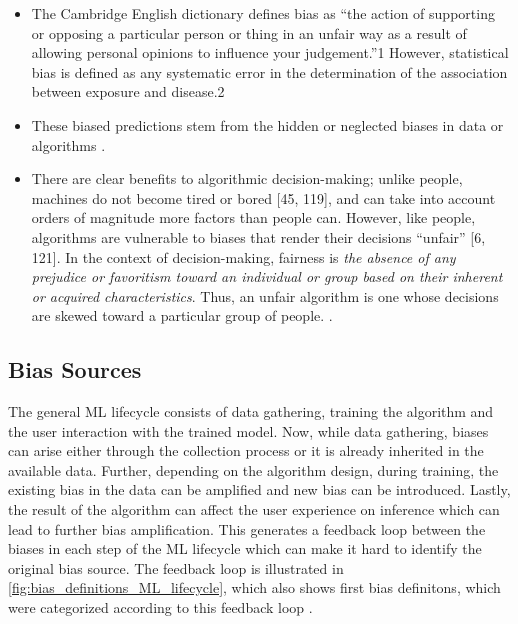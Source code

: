 \documentclass[12pt, a4paper, oneside]{book}   	%
\newif\ifrawcitationactive
\newcommand{\rawcitationusedstart}{\color{violet}}
\newcommand{\rawcitationusedend}{%
	\ifrawcitationactive
	\color{purple}  %
	\else
	\color{black}  %
	\fi
}
\begin{document}
			\rawcitationusedstart
			\begin{itemize}
				\item The Cambridge English dictionary defines bias as “the action of supporting or opposing a particular person or thing in an unfair way as a result of allowing personal opinions to influence your judgement.”1 However, statistical bias is defined as any systematic error in the determination of the association between exposure and disease.2 \autocite{Chakraborty_2024}
				\item These biased predictions stem from the hidden or neglected biases in data or algorithms \autocite{Mehrabi_2021}.
				\item There are clear benefits to algorithmic decision-making; unlike people, machines do not become tired or bored [45, 119], and can take into account orders of magnitude more factors than people can. However, like people, algorithms are vulnerable to biases that render their decisions “unfair” [6, 121]. In the context of decision-making, fairness is \textit{the absence of any prejudice or favoritism toward an individual or group based on their inherent or acquired characteristics}. Thus, an unfair algorithm is one whose decisions are skewed toward a particular group of people. \autocite{Mehrabi_2021}.
			\end{itemize}
			\rawcitationusedend
			
			\subsection{Bias Sources}
			The general ML lifecycle consists of data gathering, training the algorithm and the user interaction with the trained model. Now, while data gathering, biases can arise either through the collection process or it is already inherited in the available data. Further, depending on the algorithm design, during training, the existing bias in the data can be amplified and new bias can be introduced. Lastly, the result of the algorithm can affect the user experience on inference which can lead to further bias amplification. This generates a feedback loop between the biases in each step of the ML lifecycle which can make it hard to identify the original bias source. The feedback loop is illustrated in \autoref{fig:bias_definitions_ML_lifecycle}, which also shows first bias definitons, which were categorized according to this feedback loop \autocite{Mehrabi_2021}.
			
\end{document}
